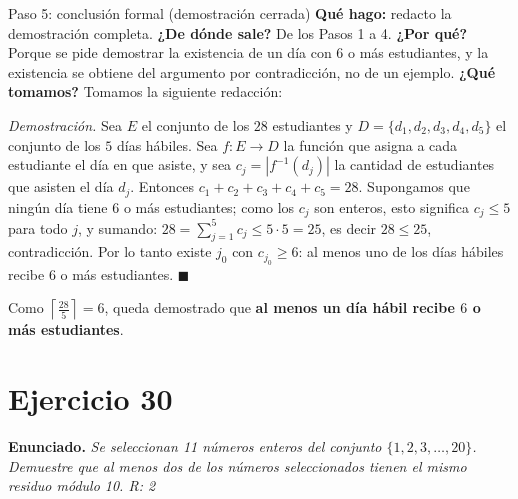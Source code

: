 \documentclass[11pt]{article}
\begin{document}
\begin{sol}
\begin{paso}{Paso 5: conclusi\'on formal (demostraci\'on cerrada)}
\textbf{Qu\'e hago:} redacto la demostraci\'on completa.
\textbf{¿De d\'onde sale?} De los Pasos 1 a 4.
\textbf{¿Por qu\'e?} Porque se pide demostrar la existencia de un d\'ia con $6$ o m\'as estudiantes, y la existencia se obtiene del argumento por contradicci\'on, no de un ejemplo.
\textbf{¿Qu\'e tomamos?} Tomamos la siguiente redacci\'on:

\medskip
\emph{Demostraci\'on.} Sea $E$ el conjunto de los $28$ estudiantes y $D=\{d_1,d_2,d_3,d_4,d_5\}$ el conjunto de los $5$ d\'ias h\'abiles. Sea $f:E\to D$ la funci\'on que asigna a cada estudiante el d\'ia en que asiste, y sea $c_j=|f^{-1}(d_j)|$ la cantidad de estudiantes que asisten el d\'ia $d_j$. Entonces $c_1+c_2+c_3+c_4+c_5 = 28$. Supongamos que ning\'un d\'ia tiene $6$ o m\'as estudiantes; como los $c_j$ son enteros, esto significa $c_j\le 5$ para todo $j$, y sumando: $28 = \sum_{j=1}^{5}c_j \le 5\cdot 5 = 25$, es decir $28\le 25$, contradicci\'on. Por lo tanto existe $j_0$ con $c_{j_0}\ge 6$: al menos uno de los d\'ias h\'abiles recibe $6$ o m\'as estudiantes. $\blacksquare$
\end{paso}

\end{sol}

\begin{resp}
Como $\left\lceil \frac{28}{5}\right\rceil = 6$, queda demostrado que \textbf{al menos un d\'ia h\'abil recibe $6$ o m\'as estudiantes}.
\end{resp}

\section*{Ejercicio 30}

\textbf{Enunciado.} \emph{Se seleccionan 11 n\'umeros enteros del conjunto $\{1,2,3,\dots,20\}$. Demuestre que al menos dos de los n\'umeros seleccionados tienen el mismo residuo m\'odulo 10. R: 2}
\end{document}
